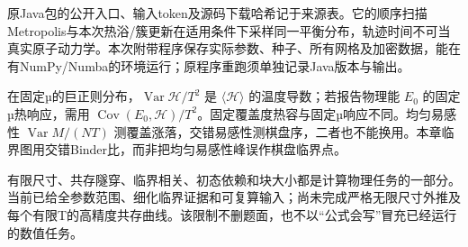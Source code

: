 原Java包的公开入口、输入token及源码下载哈希记于来源表。它的顺序扫描Metropolis与本次热浴/簇更新在适用条件下采样同一平衡分布，轨迹时间不可当真实原子动力学。本次附带程序保存实际参数、种子、所有网格及加密数据，能在有NumPy/Numba的环境运行；原程序重跑须单独记录Java版本与输出。

在固定µ的巨正则分布，$\operatorname{Var}\mathcal H/T^2$ 是 $\langle\mathcal H\rangle$ 的温度导数；若报告物理能 $E_0$ 的固定µ热响应，需用 $\operatorname{Cov}(E_0,\mathcal H)/T^2$。固定覆盖度热容与固定µ响应不同。均匀易感性 $\operatorname{Var}M/(NT)$ 测覆盖涨落，交错易感性测棋盘序，二者也不能换用。本章临界图用交错Binder比，而非把均匀易感性峰误作棋盘临界点。

有限尺寸、共存隧穿、临界相关、初态依赖和块大小都是计算物理任务的一部分。当前已给全参数范围、细化临界证据和可复算输入；尚未完成严格无限尺寸外推及每个有限T的高精度共存曲线。该限制不删题面，也不以“公式会写”冒充已经运行的数值任务。
